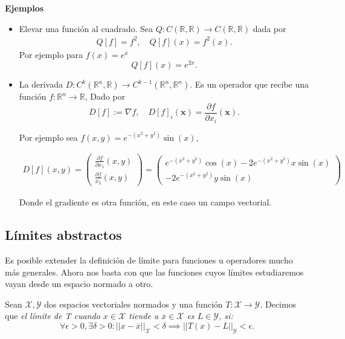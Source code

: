 \documentclass[12pt]{book}
\begin{document}
\textbf{Ejemplos}

\begin{itemize}
    \item Elevar una función al cuadrado. Sea $Q:C(\mathbb{R},\mathbb{R})\to C(\mathbb{R},\mathbb{R})$ dada por
    \begin{align*}
        Q[f] = f^2,\quad Q[f](x) = f^2(x).
    \end{align*}
    Por ejemplo para $f(x) = e^x$
    \[
        Q[f](x)=e^{2x}.
    \]
    \item La derivada $D:C^k(\mathbb{R}^n,\mathbb{R})\to C^{k-1}(\mathbb{R}^n,\mathbb{R}^n)$. Es un operador que recibe una función $f:\mathbb{R}^n\to\mathbb{R}$, Dado por
    \[
        D[f]:=\nabla f,\quad D[f]_i(\mathbf{x}) = \frac{\partial f}{\partial x_i}(\mathbf{x}).
    \]

    Por ejemplo sea $f(x,y)=e^{-(x ^2+y^2)}\sin(x)$,

    \begin{align*}
        D[f](x,y)=\begin{pmatrix}
           \frac{\partial f}{\partial x_1}(x,y) \\ \frac{\partial f}{x_2}(x,y) 
        \end{pmatrix} =  \begin{pmatrix}  e^{-(x^2+y^2)}\cos(x)-2e^{-(x^2+y^2)}x\sin(x)\\ -2e^{-(x^2+y^2)}y\sin(x) \end{pmatrix}
    \end{align*}

    Donde el gradiente es otra función, en este caso un campo vectorial.
\end{itemize}

\subsection{Límites abstractos}
\noindent
Es posible extender la definición de límite para funciones u operadores mucho más generales. Ahora nos basta con que las funciones cuyos límites estudiaremos vayan desde un espacio normado a otro.

\begin{definitionenv}
    Sean $\mathcal{X}, \mathcal{Y}$ dos espacios vectoriales normados y una función $T:\mathcal{X}\to \mathcal{Y}$. Decimos que \textit{el límite de T cuando $x\in \mathcal{X} $ tiende a $\overline{x}\in \mathcal{X}$ es $L\in \mathcal{Y}$, si:}
    \[
        \forall \epsilon>0,\exists \delta >0:||x-\overline{x}||_\mathcal{X}<\delta \implies ||T(x)-L||_\mathcal{Y}<\epsilon.
    \]
\end{definitionenv}
\end{document}
